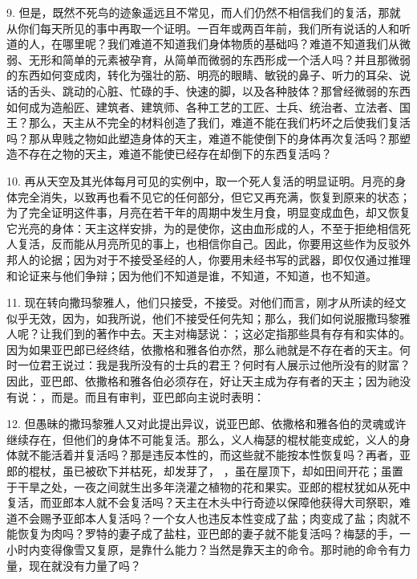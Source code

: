 9. 但是，既然不死鸟的迹象遥远且不常见，而人们仍然不相信我们的复活，那就从你们每天所见的事中再取一个证明。一百年或两百年前，我们所有说话的人和听道的人，在哪里呢？我们难道不知道我们身体物质的基础吗？难道不知道我们从微弱、无形和简单的元素被孕育，从简单而微弱的东西形成一个活人吗？并且那微弱的东西如何变成肉，转化为强壮的筋、明亮的眼睛、敏锐的鼻子、听力的耳朵、说话的舌头、跳动的心脏、忙碌的手、快速的脚，以及各种肢体？那曾经微弱的东西如何成为造船匠、建筑者、建筑师、各种工艺的工匠、士兵、统治者、立法者、国王？那么，天主从不完全的材料创造了我们，难道不能在我们朽坏之后使我们复活吗？那从卑贱之物如此塑造身体的天主，难道不能使倒下的身体再次复活吗？那塑造不存在之物的天主，难道不能使已经存在却倒下的东西复活吗？\par

10. 再从天空及其光体每月可见的实例中，取一个死人复活的明显证明。月亮的身体完全消失，以致再也看不见它的任何部分，但它又再充满，恢复到原来的状态；为了完全证明这件事，月亮在若干年的周期中发生月食，明显变成血色，却又恢复它光亮的身体：天主这样安排，为的是使你，这由血形成的人，不至于拒绝相信死人复活，反而能从月亮所见的事上，也相信你自己。因此，你要用这些作为反驳外邦人的论据；因为对于不接受圣经的人，你要用未经书写的武器，即仅仅通过推理和论证来与他们争辩；因为他们不知道是谁，不知道，不知道，也不知道。\par

11. 现在转向撒玛黎雅人，他们只接受，不接受。对他们而言，刚才从所读的经文似乎无效，因为，如我所说，他们不接受任何先知；那么，我们如何说服撒玛黎雅人呢？让我们到的著作中去。天主对梅瑟说：；这必定指那些具有存有和实体的。因为如果亚巴郎已经终结，依撒格和雅各伯亦然，那么祂就是不存在者的天主。何时一位君王说过：我是我所没有的士兵的君王？何时有人展示过他所没有的财富？因此，亚巴郎、依撒格和雅各伯必须存在，好让天主成为存有者的天主；因为祂没有说：，而是。而且有审判，亚巴郎向主说时表明： \par

12. 但愚昧的撒玛黎雅人又对此提出异议，说亚巴郎、依撒格和雅各伯的灵魂或许继续存在，但他们的身体不可能复活。那么，义人梅瑟的棍杖能变成蛇，义人的身体就不能活着并复活吗？那是违反本性的，而这些就不能按本性恢复吗？再者，亚郎的棍杖，虽已被砍下并枯死，却发芽了， ，虽在屋顶下，却如田间开花；虽置于干旱之处，一夜之间就生出多年浇灌之植物的花和果实。亚郎的棍杖犹如从死中复活，而亚郎本人就不会复活吗？天主在木头中行奇迹以保障他获得大司祭职，难道不会赐予亚郎本人复活吗？一个女人也违反本性变成了盐；肉变成了盐；肉就不能恢复为肉吗？罗特的妻子成了盐柱，亚巴郎的妻子就不能复活吗？梅瑟的手，一小时内变得像雪又复原，是靠什么能力？当然是靠天主的命令。那时祂的命令有力量，现在就没有力量了吗？\par

